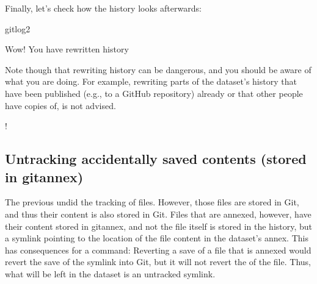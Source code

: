\sphinxAtStartPar
Finally, let’s check how the history looks afterwards:

\begin{sphinxVerbatim}[commandchars=\\\{\}]
gitlog\PYGZhy{}2



\end{sphinxVerbatim}

\sphinxAtStartPar
Wow! You have rewritten history%
\begin{footnote}\sphinxAtStartFootnote
Note though that rewriting history can be dangerous, and you should
be aware of what you are doing. For example, rewriting parts of the
dataset’s history that have been published (e.g., to a GitHub repository)
already or that other people have copies of, is not advised.
%
\end{footnote}!

\ignorespaces 

\subsection{Untracking accidentally saved contents (stored in git\sphinxhyphen{}annex)}
\label{\detokenize{basics/101-137-history:untracking-accidentally-saved-contents-stored-in-git-annex}}\label{\detokenize{basics/101-137-history:index-4}}
\sphinxAtStartPar
The previous  undid the tracking of  files.
However, those files are stored in Git, and thus their content
is also stored in Git. Files that are annexed, however, have
their content stored in git\sphinxhyphen{}annex, and not the file itself is stored
in the history, but a symlink pointing to the location of the file
content in the dataset’s annex. This has consequences for
a  command: Reverting a save of a file that is
annexed would revert the save of the symlink into Git, but it will
not revert the  of the file.
Thus, what will be left in the dataset is an untracked symlink.


